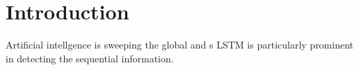 \section{Introduction}
Artificial intellgence is sweeping the global and s
LSTM is particularly prominent in detecting the sequential information. 